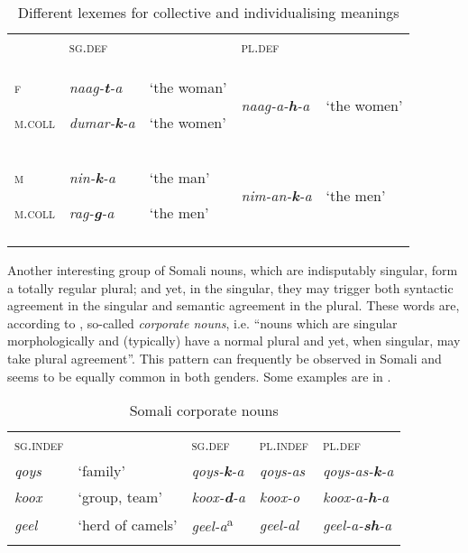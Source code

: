 \documentclass[output=paper]{langsci/langscibook}
\begin{document}
\begin{table}
\caption{Different lexemes for collective and individualising meanings}
\label{tab:13}
\begin{tabularx}{\textwidth}{XXXXX} & {\textsc{sg.def}} &  & {\textsc{pl.def}} & \\
\lsptoprule
{\textsc{f}}

{\textsc{m.coll}} & {\textit{naag-}\textbf{\textit{t}}\textit{{}-a}}

{\textit{dumar-}\textbf{\textit{k}}\textit{{}-a}} & {‘the woman’}

{‘the women’} & {\textit{naag-a-}\textbf{\textit{h}}\textit{{}-a}} & {‘the women’}\\
{\textsc{m}}

{\textsc{m.coll}} & {\textit{nin-}\textbf{\textit{k}}\textit{{}-a}}

{\textit{rag-}\textbf{\textit{g}}\textit{{}-a}} & {‘the man’}

{‘the men’} & {\textit{nim-an-}\textbf{\textit{k}}\textit{{}-a}} & {‘the men’}\\
\lspbottomrule
\end{tabularx}

\end{table} 



Another interesting group of Somali nouns, which are indisputably singular, form a totally regular plural; and yet, in the singular, they may trigger both syntactic agreement in the singular and semantic agreement in the plural. These words are, according to \citet[188]{Corbett2000}, so-called \textit{corporate nouns}, i.e. “nouns which are singular morphologically and (typically) have a normal plural and yet, when singular, may take plural agreement”. This pattern can frequently be observed in Somali and seems to be equally common in both genders. Some examples are in .
 
\begin{table}
\caption{Somali corporate nouns}
\label{tab:14}
\begin{tabularx}{\textwidth}{XXXXX}
\lsptoprule
{\textsc{sg.indef}} &  & {\textsc{sg.def}} & {\textsc{pl.indef}} & {\textsc{pl.def}}\\
{\textit{qoys}} & {‘family’} & {\textit{qoys-}\textbf{\textit{k}}\textit{{}-a}} & {\textit{qoys-as}} & {\textit{qoys-as-}\textbf{\textit{k}}\textit{{}-a}}\\
{\textit{koox}} & {‘group, team’} & {\textit{koox-}\textbf{\textit{d}}\textit{{}-a}} & {\textit{koox-o}} & {\textit{koox-a-}\textbf{\textit{h}}\textit{{}-a}}\\
{\textit{geel}} & {‘herd of camels’} & {\textit{geel-a}\textsuperscript{a}} & {\textit{geel-al}} & {\textit{geel-a-}\textbf{\textit{sh}}\textit{{}-a}}\\
\lspbottomrule
\end{tabularx}

\end{table} 
\end{document}
